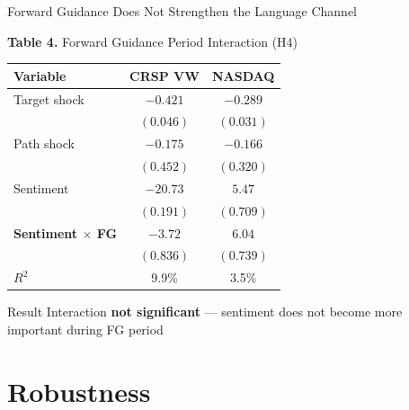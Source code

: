\documentclass[aspectratio=169, 11pt]{beamer}
\begin{document}
\begin{frame}{Forward Guidance Does Not Strengthen the Language Channel}
\begin{center}
{\small \textbf{Table 4.} Forward Guidance Period Interaction (H4)}
\end{center}
\vspace{0.1em}
\begin{center}
{\small
\begin{tabular}{lcc}
\toprule
Variable & CRSP VW & NASDAQ \\
\midrule
Target shock & $-0.421$ & $-0.289$ \\
 & $(0.046)$ & $(0.031)$ \\
Path shock & $-0.175$ & $-0.166$ \\
 & $(0.452)$ & $(0.320)$ \\
Sentiment & $-20.73$ & $5.47$ \\
 & $(0.191)$ & $(0.709)$ \\
\textbf{Sentiment $\times$ FG} & $-3.72$ & $6.04$ \\
 & $\mathbf{(0.836)}$ & $\mathbf{(0.739)}$ \\
\midrule
$R^2$ & 9.9\% & 3.5\% \\
\bottomrule
\end{tabular}
}
\end{center}

\vspace{0.2em}
\begin{aalertblock}{Result}
Interaction \textbf{not significant} --- sentiment does not become more important during FG period
\end{aalertblock}
\end{frame}

\section{Robustness}
\end{document}

